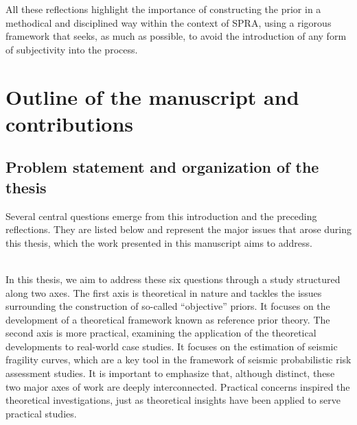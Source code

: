 All these reflections highlight the importance of constructing the prior in a methodical and disciplined way within the context of SPRA, using a rigorous framework that seeks, as much as possible, to avoid the introduction of any form of subjectivity into the process.





\section{Outline of the manuscript and contributions}

\subsection{Problem statement and organization of the thesis}



Several central questions emerge from this introduction and the preceding reflections. They are listed below and represent the major issues that arose during this thesis, which the work presented in this manuscript aims to address.\\







\\[1pt]


In this thesis, we aim to address these six questions through a study structured along two axes.
The first axis is theoretical in nature and tackles the issues surrounding the construction of so-called ``objective'' priors. It focuses on the development of a theoretical framework known as reference prior theory.
The second axis is more practical, examining the application of the theoretical developments to real-world case studies. It focuses  on the estimation of seismic fragility curves, which are a key tool in the framework of seismic probabilistic risk assessment studies.
It is important to emphasize that, although distinct, these two major axes of work are deeply interconnected. Practical concerns inspired the theoretical investigations, just as theoretical insights have been applied to serve practical studies.\\



